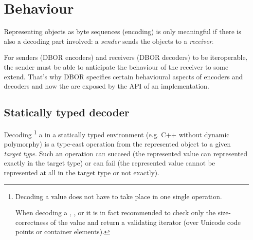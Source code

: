 
\section{Behaviour}
\label{sec:behaviour}

Representing objects as byte sequences (encoding) is only meaningful if there is also a decoding part involved:
a \emph{sender} sends the objects to a \emph{receiver}.

For senders (DBOR encoders) and receivers (DBOR decoders) to be iteroperable, the sender must be able to anticipate the
behaviour of the receiver to some extend.
That's why DBOR specifies certain behavioural aspects of encoders and decoders and how the are exposed by the API
of an implementation.


\subsection{Statically typed decoder}

Decoding%
\footnote{
    Decoding a value does not have to take place in one single operation.

    When decoding a \DborUtfEightStringValue, \DborSequenceValue, or \DborDictionaryValue{} it is in fact recommended to
    check only the size-correctness of the value and return a validating iterator
    (over Unicode code points or container elements).
}
a \DborValue{} in a statically typed environment (e.g. C++ without dynamic polymorphy) is a
type-cast operation from the represented object to a given \emph{target type}.
Such an operation can succeed (the represented value can represented exactly in the target type) or
can fail (the represented value cannot be represented at all in the target type or not exactly).

